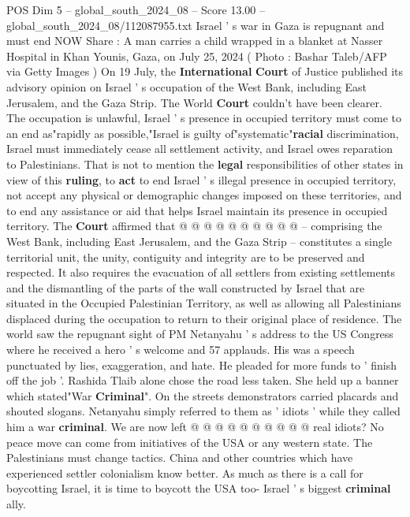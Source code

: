 \begin{textsample}{POS Dim 5 – global\_south\_2024\_08 – Score 13.00 – global\_south\_2024\_08/112087955.txt}  \label{ex:f5_pos_326}
Israel ' s war in Gaza is repugnant and must end NOW Share : A man carries a child wrapped in a blanket at Nasser Hospital in Khan Younis, Gaza, on July 25, 2024 ( Photo : Bashar Taleb/AFP via Getty Images ) On 19 July, the \textbf{International} \textbf{Court} of Justice published its advisory opinion on Israel ' s occupation of the West Bank, including East Jerusalem, and the Gaza Strip.
The World \textbf{Court} couldn't have been clearer.
The occupation is unlawful, Israel ' s presence in occupied territory must come to an end as"rapidly as possible,"Israel is guilty of"systematic"\textbf{racial} discrimination, Israel must immediately cease all settlement activity, and Israel owes reparation to Palestinians.
That is not to mention the \textbf{legal} responsibilities of other states in view of this \textbf{ruling}, to \textbf{act} to end Israel ' s illegal presence in occupied territory, not accept any physical or demographic changes imposed on these territories, and to end any assistance or aid that helps Israel maintain its presence in occupied territory.
The \textbf{Court} affirmed that @ @ @ @ @ @ @ @ @ @ -- comprising the West Bank, including East Jerusalem, and the Gaza Strip -- constitutes a single territorial unit, the unity, contiguity and integrity are to be preserved and respected.
It also requires the evacuation of all settlers from existing settlements and the dismantling of the parts of the wall constructed by Israel that are situated in the Occupied Palestinian Territory, as well as allowing all Palestinians displaced during the occupation to return to their original place of residence.
The world saw the repugnant sight of PM Netanyahu ' s address to the US Congress where he received a hero ' s welcome and 57 applauds.
His was a speech punctuated by lies, exaggeration, and hate.
He pleaded for more funds to ' finish off the job '.
Rashida Tlaib alone chose the road less taken.
She held up a banner which stated"War \textbf{Criminal}".
On the streets demonstrators carried placards and shouted slogans.
Netanyahu simply referred to them as ' idiots ' while they called him a war \textbf{criminal}.
We are now left @ @ @ @ @ @ @ @ @ @ real idiots?
No peace move can come from initiatives of the USA or any western state.
The Palestinians must change tactics.
China and other countries which have experienced settler colonialism know better.
As much as there is a call for boycotting Israel, it is time to boycott the USA too- Israel ' s biggest \textbf{criminal} ally.

\end{textsample}
